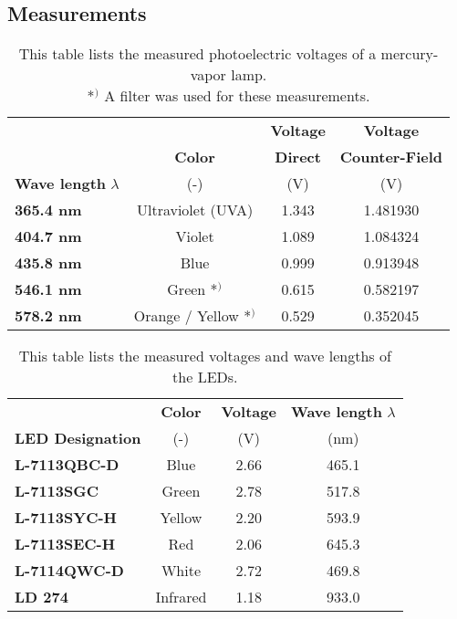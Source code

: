 \begin{appendix}
	\section{Measurements}
	\label{sec:Measurements}

	\begin{table}[H]
		\centering
		\begin{tabular}{l|c|c|c}
			\multicolumn{1}{c}{} &  & \textbf{Voltage} & \textbf{Voltage} \\
			& \textbf{Color} & \textbf{Direct} & \textbf{Counter-Field} \\
			\textbf{Wave length} $\lambda$ & (-) & (V) & (V) \\
			\hline\hline
			\textbf{365.4 nm} & Ultraviolet (UVA) & 1.343 & 1.481930 \\ \hline
			\textbf{404.7 nm} & Violet & 1.089 & 1.084324 \\ \hline
			\textbf{435.8 nm} & Blue & 0.999 & 0.913948 \\ \hline
			\textbf{546.1 nm} & Green *$^)$ & 0.615 & 0.582197 \\ \hline
			\textbf{578.2 nm} & Orange / Yellow *$^)$ & 0.529 & 0.352045 \\ \hline
		\end{tabular}
		\caption{This table lists the measured photoelectric voltages of a mercury-vapor lamp.\\ *$^)$ A filter was used for these measurements. }
		\label{tab:Hg_Measurements}
	\end{table}

	\begin{table}[H]
		\centering
		\begin{tabular}{l|c|c|c}
			& \textbf{Color} & \textbf{Voltage} & \textbf{Wave length} $\lambda$ \\
			\textbf{LED Designation} & (-) & (V) & (nm) \\
			\hline\hline
			\textbf{L-7113QBC-D} & Blue & 2.66 & 465.1 \\ \hline
			\textbf{L-7113SGC} & Green & 2.78 & 517.8 \\ \hline
			\textbf{L-7113SYC-H} & Yellow & 2.20 & 593.9 \\ \hline
			\textbf{L-7113SEC-H} & Red & 2.06 & 645.3 \\ \hline
			\textbf{L-7114QWC-D} & White & 2.72 & 469.8 \\ \hline
			\textbf{LD 274} & Infrared & 1.18 & 933.0 \\ \hline
		\end{tabular}
		\caption{This table lists the measured voltages and wave lengths of the LEDs.}
		\label{tab:LED_Measurements}
	\end{table}
	

\end{appendix}
